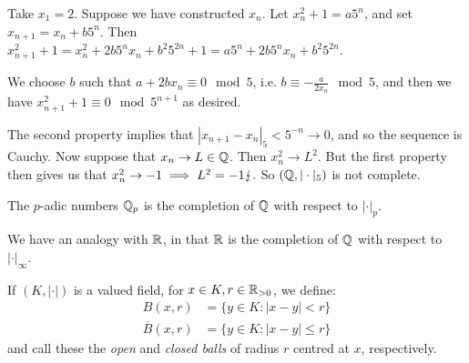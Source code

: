 \documentclass[10pt,a4paper]{article}
\begin{document}
Take $x_1 = 2$. Suppose we have constructed $x_n$. Let $x_n^2 + 1 = a5^n$, and set $x_{n+1} = x_n + b5^n$. Then $x_{n+1}^2 + 1=  x_n^2 + 2b5^nx_n + b^2 5^{2n} + 1 = a5^n + 2b5^nx_n + b^2 5^{2n}$.

We choose $b$ such that $a+2bx_n \equiv 0 \mod 5$, i.e. $b \equiv -\frac{a}{2x_n} \mod 5$, and then we have $x_{n+1}^2 +1 \equiv 0 \mod 5^{n+1}$ as desired.

The second property implies that $|x_{n+1} - x_n|_5 < 5^{-n} \to 0$, and so the sequence is Cauchy. Now suppose that $x_n \to L \in \mathbb{Q}$. Then $x_n^2 \to L^2$. But the first property then gives us that $x_n^2 \to -1 \implies L^2 = -1 \lightning.$ So $(\mathbb{Q}, |\cdot|_5)$ is not complete.

\begin{definition}
  The $p$-adic numbers $\mathbb{Q}_p$ is the completion of $\mathbb{Q}$ with respect to $|\cdot|_p$.
\end{definition}
We have an analogy with $\mathbb{R}$, in that $\mathbb{R}$ is the completion of $\mathbb{Q}$ with respect to $|\cdot|_\infty$.

If $(K, |\cdot|)$ is a valued field, for $x \in K, r \in \mathbb{R}_{>0}$, we define:
\begin{align*}
  B(x, r) &= \{y \in K : |x-y| < r \}\\
  \overline{B}(x, r) &= \{y \in K : |x-y| \leq r\}
\end{align*}
and call these the \emph{open} and \emph{closed balls} of radius $r$ centred at $x$, respectively.
\end{document}
